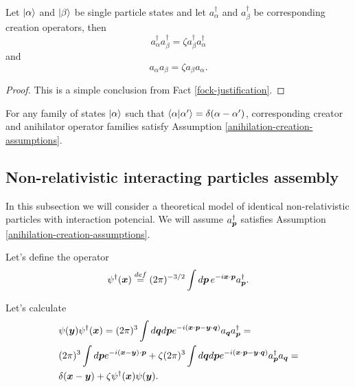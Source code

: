 \documentclass[main.tex]{subfiles}
\begin{document}
\begin{proposition}
Let $\ket{\alpha}$ and $\ket{\beta}$ be single particle states and let $a^\dagger_{\alpha}$ and $a^\dagger_{\beta}$ be corresponding creation operators, then
\begin{equation}
a^\dagger_\alpha a^\dagger_\beta = \zeta  a^\dagger_\beta a^\dagger_\alpha
\end{equation}
and
\begin{equation}
a_\alpha a_\beta = \zeta  a_\beta a_\alpha.
\end{equation}
\end{proposition}
\begin{proof}
This is a simple conclusion from Fact \ref{fock-justification}.
\end{proof}
\begin{corollary}
For any family of states $\ket{\alpha}$ such that $\bra{\alpha}\ket{\alpha'} = \delta(\alpha - \alpha')$, corresponding creator and anihilator operator families satisfy Assumption \ref{anihilation-creation-assumptions}. 
\end{corollary}

\subsection{Non-relativistic interacting particles assembly}

In this subsection we will consider a theoretical model of identical non-relativistic particles with interaction potencial. We will assume $a^\dagger_{\boldsymbol{p}}$ satisfies Assumption \ref{anihilation-creation-assumptions}.

Let's define the operator
\begin{equation}
\psi^\dagger(\boldsymbol{x}) \stackrel{def}{=} (2\pi)^{-3/2}\int d\boldsymbol{p}\, e^{-i\boldsymbol{x}\cdot \boldsymbol{p}} a^\dagger_{\boldsymbol{p}}.
\end{equation}

Let's calculate
\begin{align*}
&\psi(\boldsymbol{y})\psi^\dagger(\boldsymbol{x}) = (2\pi)^3 \int d\boldsymbol{q}d\boldsymbol{p} e^{-i(\boldsymbol{x}\cdot \boldsymbol{p} - \boldsymbol{y}\cdot \boldsymbol{q})} a_{\boldsymbol{q}} a^\dagger_{\boldsymbol{p}} = \\
& (2\pi)^3 \int d\boldsymbol{p} e^{-i(\boldsymbol{x} - \boldsymbol{y})\cdot \boldsymbol{p}} + \zeta (2\pi)^3 \int d\boldsymbol{q}d\boldsymbol{p} e^{-i(\boldsymbol{x}\cdot \boldsymbol{p} - \boldsymbol{y}\cdot \boldsymbol{q})} a^\dagger_{\boldsymbol{p}} a_{\boldsymbol{q}}  = \\
& \delta(\boldsymbol{x} - \boldsymbol{y}) + \zeta \psi^\dagger(\boldsymbol{x}) \psi(\boldsymbol{y}).
\end{align*}
\end{document}
